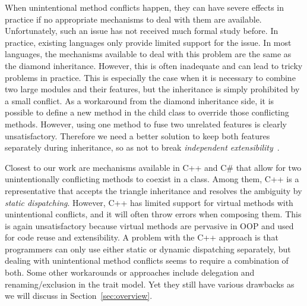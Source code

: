 
When unintentional method conflicts happen, they can have severe
effects in practice if no
appropriate mechanisms to deal with them are available. 
Unfortunately, such an issue has not received much formal study 
before. In practice, existing languages only provide limited support for
the issue. In most languages, the mechanisms available to deal with this problem are the same as the diamond
inheritance. However, this is often inadequate and can lead 
to tricky problems in practice. This is especially the case
when it is necessary to combine two large modules and their features,
but the inheritance is simply prohibited by a small conflict. 
As a workaround from the diamond inheritance side, it is possible to
define a new method in the child class to override those conflicting
methods. However, using one method to fuse two unrelated features
is clearly unsatisfactory. Therefore we need a better solution to keep both
features separately during inheritance, so as not to break
\emph{independent extensibility}~\cite{zenger05independentlyextensible}.

Closest to our work are mechanisms available in C++ and C\# that allow for two
unintentionally conflicting methods to coexist in a class. Among them, 
C++ is a representative that accepts the triangle inheritance and
resolves the ambiguity by \emph{static dispatching}. However, C++ has
limited support for virtual methods with unintentional conflicts, and
it will often throw errors when composing them. This is again
unsatisfactory because virtual methods are pervasive in OOP and used 
for code reuse and extensibility. A problem with the C++ approach is
that programmers can only use either static or dynamic dispatching separately, but dealing
with unintentional method conflicts seems to require a combination of
both. 
Some other workarounds or approaches include delegation and
renaming/exclusion in the trait model. Yet they still have various
drawbacks as we will discuss in Section~\ref{sec:overview}.



